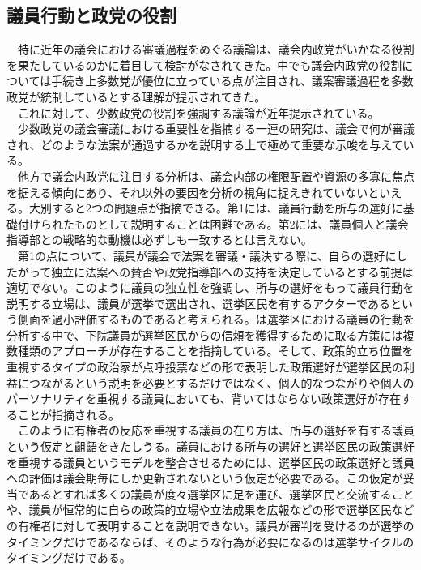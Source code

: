 \subsection{議員行動と政党の役割}
　特に近年の議会における審議過程をめぐる議論は、議会内政党がいかなる役割を果たしているのかに着目して検討がなされてきた。中でも議会内政党の役割については手続き上多数党が優位に立っている点が注目され、議案審議過程を多数政党が統制しているとする理解が提示されてきた。\citep*{Cox2005-pn,Cox2007-xq}\\
　これに対して、少数政党の役割を強調する議論が近年提示されている。\citep*{Hughes2018-dj,Hughes2021-cp,Ballard2021-su}\\
　少数政党の議会審議における重要性を指摘する一連の研究は、議会で何が審議され、どのような法案が通過するかを説明する上で極めて重要な示唆を与えている。\\
　他方で議会内政党に注目する分析は、議会内部の権限配置や資源の多寡に焦点を据える傾向にあり、それ以外の要因を分析の視角に捉えきれていないといえる。大別すると2つの問題点が指摘できる。第1には、議員行動を所与の選好に基礎付けられたものとして説明することは困難である。第2には、議員個人と議会指導部との戦略的な動機は必ずしも一致するとは言えない。\\
　第1の点について、議員が議会で法案を審議・議決する際に、自らの選好にしたがって独立に法案への賛否や政党指導部への支持を決定しているとする前提は適切でない。このように議員の独立性を強調し、所与の選好をもって議員行動を説明する立場は、議員が選挙で選出され、選挙区民を有するアクターであるという側面を過小評価するものであると考えられる。\citet*{Fenno1977-se,Fenno2000-up}は選挙区における議員の行動を分析する中で、下院議員が選挙区民からの信頼を獲得するために取る方策には複数種類のアプローチが存在することを指摘している。そして、政策的立ち位置を重視するタイプの政治家が点呼投票などの形で表明した政策選好が選挙区民の利益につながるという説明を必要とするだけではなく、個人的なつながりや個人のパーソナリティを重視する議員においても、背いてはならない政策選好が存在することが指摘される。\citep*{Fenno2000-up}\\
　このように有権者の反応を重視する議員の在り方は、所与の選好を有する議員という仮定と齟齬をきたしうる。議員における所与の選好と選挙区民の政策選好を重視する議員というモデルを整合させるためには、選挙区民の政策選好と議員への評価は議会期毎にしか更新されないという仮定が必要である。この仮定が妥当であるとすれば多くの議員が度々選挙区に足を運び、選挙区民と交流することや、議員が恒常的に自らの政策的立場や立法成果を広報などの形で選挙区民などの有権者に対して表明することを説明できない。議員が審判を受けるのが選挙のタイミングだけであるならば、そのような行為が必要になるのは選挙サイクルのタイミングだけである。\\
